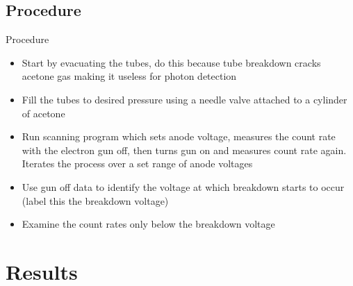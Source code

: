 \documentclass[12pt, aspectratio=169]{beamer}
\begin{document}
\subsection{Procedure}
\begin{frame}{Procedure}
    \begin{itemize}
        \item Start by evacuating the tubes, do this because tube breakdown cracks acetone gas making it useless for photon detection 
        \item Fill the tubes to desired pressure using a needle valve attached to a cylinder of acetone
        \item Run scanning program which sets anode voltage, measures the count rate with the electron gun off, then turns gun on and measures count rate again. Iterates the process 
        over a set range of anode voltages 
        \item Use gun off data to identify the voltage at which breakdown starts to occur (label this the breakdown voltage)
        \item Examine the count rates only below the breakdown voltage 
    \end{itemize}
\end{frame}

\section{Results}
\end{document}

